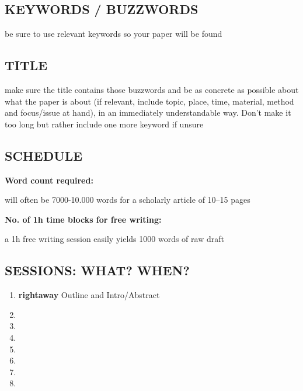 \documentclass{article}
\begin{document}
\begin{minipage}[t]{0.5\textwidth}

\begin{tcolorbox}\subsection*{\MakeUppercase{Keywords / Buzzwords}}{\scriptsize be sure to use relevant keywords so your paper will be found

}

\color{white}\lipsum[75]\end{tcolorbox}
\begin{tcolorbox}\subsection*{\MakeUppercase{Title}}{\scriptsize make sure the title contains those buzzwords and be as concrete as possible about what the paper is about (if relevant, include topic, place, time, material, method and focus/issue at hand), in an immediately understandable way. Don't make it too long but rather include one more keyword if unsure

}\vspace{0.5em}

\color{white}\lipsum[75]\end{tcolorbox}
\begin{tcolorbox}\subsection*{\MakeUppercase{SCHEDULE}}
\footnotesize
\textbf{Word count required: }

{\scriptsize will often be 7000-10.000 words for a scholarly article of 10--15 pages

}\vspace{1em}

\textbf{No. of 1h time blocks for free writing: }

{\scriptsize a 1h free writing session easily yields 1000 words of raw draft

}\vspace{2em}

\subsection*{\MakeUppercase{Sessions: What? When?}}
\begin{enumerate}
    \item \textbf{\lbrack{}rightaway\rbrack{}} Outline and Intro/Abstract
    \item 
    \item 
    \item 
    \item 
    \item 
    \item 
    \item
\end{enumerate}\vspace{2em}


\end{tcolorbox}
\end{minipage}
\end{document}

